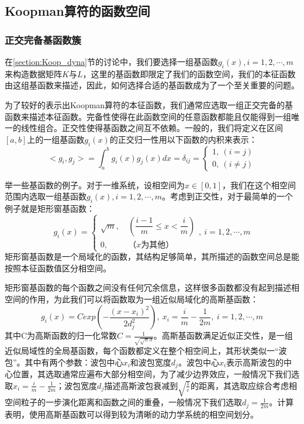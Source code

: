 \subsection{Koopman算符的函数空间}
\subsubsection{正交完备基函数簇}
在\ref{section:Koop_dyna}节的讨论中，我们要选择一组基函数${g_i(x)},i=1,2,\cdots,m$来构造数据矩阵$K$与$L$，这里的基函数即限定了我们的函数空间，我们的本征函数由这组基函数来描述，因此，如何选择合适的基函数成为了一个至关重要的问题。

为了较好的表示出Koopman算符的本征函数，我们通常应选取一组正交完备的基函数来描述本征函数。完备性使得在此函数空间的任意函数都能且仅能得到一组唯一的线性组合。正交性使得基函数之间互不依赖。一般的，我们将定义在区间$[a,b]$上的一组基函数${g_i(x)}$的正交归一性\cite{strogatz2001nonlinear}用以下函数的内积来表示：
\begin{equation}
    <g_i,g_j>=\int_a^b{g_i(x)g_j(x)}dx=\delta_{ij}=
    \begin{cases}
        1,\ (i=j)\\
        0,\ (i\neq j)
    \end{cases}
\end{equation}

举一些基函数的例子。对于一维系统，设相空间为$x\in [0,1]$，我们在这个相空间范围内选取一组基函数${g_i(x)},i=1,2,\cdots,m$。考虑到正交性，对于最简单的一个例子就是矩形窗基函数：
\begin{equation}
    g_i(x)=
    \begin{cases}
        \sqrt{m},\ &(\dfrac{i-1}{m}\leqslant x<\dfrac{i}{m})\\
        0,\ &（x为其他）
    \end{cases},\ i=1,2,\cdots,m
\end{equation}
矩形窗基函数是一个局域化的函数，其结构足够简单，其所描述的函数空间总是能按照本征函数值区分相空间。

矩形窗基函数的每个函数之间没有任何冗余信息，这样很多函数都没有起到描述相空间的作用，为此我们可以将函数取为一组近似局域化的高斯基函数：
\begin{equation}
    g_i(x)=Cexp\left(-\dfrac{(x-x_i)^2}{2d_j^2}\right), \ x_i=\frac{i}{m}-\frac{1}{2m},\ i=1,2,\cdots,m
\end{equation}
其中C为高斯函数的归一化常数$C=\frac{1}{\sqrt{\sqrt{\pi}\sigma}}$。高斯基函数满足近似正交性，是一组近似局域性的全局基函数，每个函数都定义在整个相空间上，其形状类似一“波包”。其中有两个参数：波包中心$x_i$和波包宽度$d_j$。波包中心$x_i$表示高斯波包的中心位置，其选取通常应遍布大部分相空间，为了减少边界效应，一般情况下我们选取$x_i=\frac{i}{m}-\frac{1}{2m}$；波包宽度$d_j$描述高斯波包衰减到$\sqrt{\frac{1}{e}}$的距离，其选取应综合考虑相空间粒子的一步演化距离和函数之间的重叠，一般情况下我们选取$d_j=\frac{1}{2m}$。计算表明，使用高斯基函数可以得到较为清晰的动力学系统的相空间划分。

